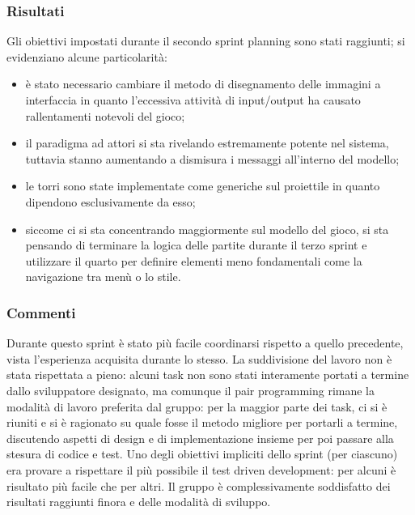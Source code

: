 \subsubsection{Risultati}
Gli obiettivi impostati durante il secondo sprint planning sono stati raggiunti; si evidenziano alcune particolarità:
\begin{itemize}
    \item è stato necessario cambiare il metodo di disegnamento delle immagini a interfaccia in quanto l'eccessiva attività di input/output ha causato rallentamenti notevoli del gioco;
    \item il paradigma ad attori si sta rivelando estremamente potente nel sistema, tuttavia stanno aumentando a dismisura i messaggi all'interno del modello;
    \item le torri sono state implementate come generiche sul proiettile in quanto dipendono esclusivamente da esso;
    \item siccome ci si sta concentrando maggiormente sul modello del gioco, si sta pensando di terminare la logica delle partite durante il terzo sprint e utilizzare il quarto per definire elementi meno fondamentali come la navigazione tra menù o lo stile.
\end{itemize}

\subsubsection{Commenti}
Durante questo sprint è stato più facile coordinarsi rispetto a quello precedente, vista l'esperienza acquisita durante
lo stesso. La suddivisione del lavoro non è stata rispettata a pieno: alcuni task non sono stati interamente portati a
termine dallo sviluppatore designato, ma comunque il pair programming rimane la modalità di lavoro preferita dal gruppo:
per la maggior parte dei task, ci si è riuniti e si è ragionato su quale fosse il metodo migliore per portarli a
termine, discutendo aspetti di design e di implementazione insieme per poi passare alla stesura di codice e test. Uno
degli obiettivi impliciti dello sprint (per ciascuno) era provare a rispettare il più possibile il test driven
development: per alcuni è risultato più facile che per altri. Il gruppo è complessivamente soddisfatto dei risultati
raggiunti finora e delle modalità di sviluppo.
